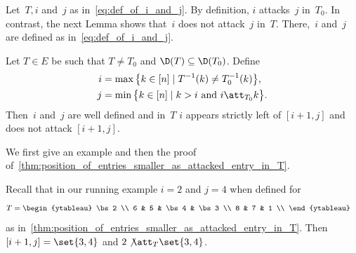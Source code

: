 Let~$T,i$ and~$j$ as in~\eqref{eq:def_of_i_and_j}.
By definition, $i$ attacks~$j$ in~$T_0$.
In contrast, the next Lemma shows that~$i$ does not attack~$j$ in~$T$.
There,~$i$ and~$j$ are defined as in~\eqref{eq:def_of_i_and_j}.

\begin{lemma}
	\label{thm:position_of_entries_smaller_as_attacked_entry_in_T}
	Let $T\in E$ be such that $T\neq T_0$ and $\D(T) \subseteq \D(T_0)$. Define
	\begin{align*}
		i &= \max \big\{k \in [n] \mid T^{-1}(k) \neq T^{-1}_0(k)\big\}, \\
		j &= \min \big\{k \in [n] \mid k>i \text{ and } i\att_{T_0} k\big\}.
	\end{align*}
	Then~$i$ and~$j$ are well defined and in~$T$ $i$ appears strictly left of $[i+1,j]$ and does not attack $[i+1,j]$. 
\end{lemma}

We first give an example and then the proof of~\cref{thm:position_of_entries_smaller_as_attacked_entry_in_T}\!.

\begin{samepage}
\begin{exam} Recall that in our running example $i=2$ and $j=4$ when defined for
	\begin{align*}
		T &= 
		\begin{ytableau} 
			\bs 2 \\ 
			6 & 5 & \bs4 & \bs3 \\ 
			8 & 7 & 1 \\ 
		\end{ytableau}
	\end{align*} 
	 as in~\cref{thm:position_of_entries_smaller_as_attacked_entry_in_T}. Then
 $[i+1,j] = \set{3,4}$ and $2\not \att_T \set{3,4}$.
\end{exam}
\end{samepage}


